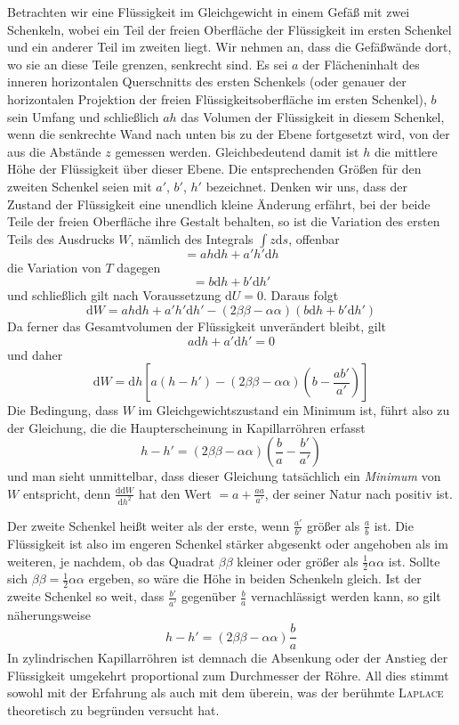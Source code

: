 Betrachten wir eine Flüssigkeit im Gleichgewicht in einem Gefäß mit zwei Schenkeln, wobei ein Teil der freien Oberfläche der Flüssigkeit im ersten Schenkel und ein anderer Teil im zweiten liegt. Wir nehmen an, dass die Gefäßwände dort, wo sie an diese Teile grenzen, senkrecht sind. Es sei $a$ der Flächeninhalt des inneren horizontalen Querschnitts des ersten Schenkels (oder genauer der horizontalen Projektion der freien Flüssigkeitsoberfläche im ersten Schenkel), $b$ sein Umfang und schließlich $ah$ das Volumen der Flüssigkeit in diesem Schenkel, wenn die senkrechte Wand nach unten bis zu der Ebene fortgesetzt wird, von der aus die Abstände $z$ gemessen werden. Gleichbedeutend damit ist $h$ die mittlere Höhe der Flüssigkeit über dieser Ebene. Die entsprechenden Größen für den zweiten Schenkel seien mit $a'$, $b'$, $h'$ bezeichnet. Denken wir uns, dass der Zustand der Flüssigkeit eine unendlich kleine Änderung erfährt, bei der beide Teile der freien Oberfläche ihre Gestalt behalten, so ist die Variation des ersten Teils des Ausdrucks $W$, nämlich des Integrals $\int z\mathrm{d}s$, offenbar
\[
=ah\mathrm{d}h+a'h'\mathrm{d}h
\]
die Variation von $T$ dagegen
\[
=b\mathrm{d}h+b'\mathrm{d}h'
\]
und schließlich gilt nach Voraussetzung $\mathrm{d}U=0$. Daraus folgt
\[
\mathrm{d}W=ah\mathrm{d}h+a'h'\mathrm{d}h'-(2\beta\beta-\alpha\alpha)(b\mathrm{d}h+b'\mathrm{d}h')
\]
Da ferner das Gesamtvolumen der Flüssigkeit unverändert bleibt, gilt
\[
a\mathrm{d}h+a'\mathrm{d}h'=0
\]
und daher
\[
\mathrm{d}W=\mathrm{d}h[a(h-h')-(2\beta\beta-\alpha\alpha)(b-\frac{ab'}{a'})]
\]
Die Bedingung, dass $W$ im Gleichgewichtszustand ein Minimum ist, führt also zu der Gleichung, die die Haupterscheinung in Kapillarröhren erfasst
\[
h-h'=(2\beta\beta-\alpha\alpha)(\frac{b}{a}-\frac{b'}{a'})
\]
und man sieht unmittelbar, dass dieser Gleichung tatsächlich ein \textit{Minimum} von $W$ entspricht, denn $\frac{\mathrm{d}\mathrm{d}W}{\mathrm{d}h^2}$ hat den Wert $=a+\frac{aa}{a'}$, der seiner Natur nach positiv ist.

Der zweite Schenkel heißt weiter als der erste, wenn $\frac{a'}{b'}$ größer als $\frac{a}{b}$ ist. Die Flüssigkeit ist also im engeren Schenkel stärker abgesenkt oder angehoben als im weiteren, je nachdem, ob das Quadrat $\beta\beta$ kleiner oder größer als $\frac12\alpha\alpha$ ist. Sollte sich $\beta\beta=\frac12\alpha\alpha$ ergeben, so wäre die Höhe in beiden Schenkeln gleich. Ist der zweite Schenkel so weit, dass $\frac{b'}{a'}$ gegenüber $\frac{b}{a}$ vernachlässigt werden kann, so gilt näherungsweise
\[
h-h'=(2\beta\beta-\alpha\alpha)\frac{b}{a}
\]
In zylindrischen Kapillarröhren ist demnach die Absenkung oder der Anstieg der Flüssigkeit umgekehrt proportional zum Durchmesser der Röhre. All dies stimmt sowohl mit der Erfahrung als auch mit dem überein, was der berühmte \textsc{Laplace} theoretisch zu begründen versucht hat.


